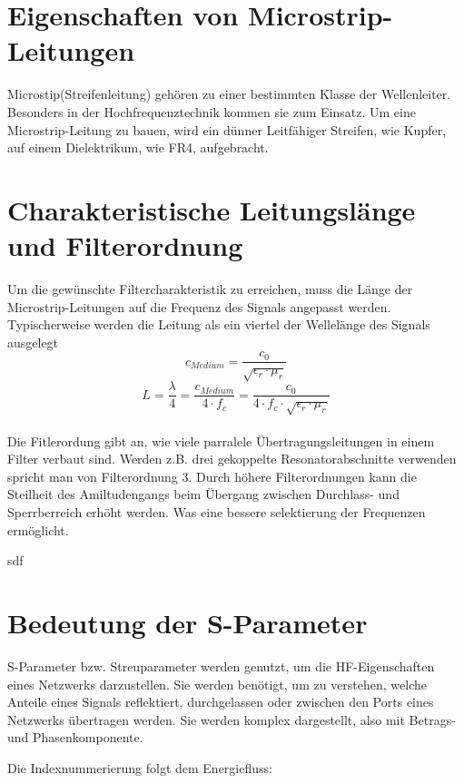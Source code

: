 \section{Eigenschaften von Microstrip-Leitungen}
Microstip(Streifenleitung) gehören zu einer bestimmten Klasse der Wellenleiter.
Besonders in der Hochfrequenztechnik kommen sie zum Einsatz.
Um eine Microstrip-Leitung zu bauen, wird ein dünner Leitfähiger Streifen, wie Kupfer, auf einem Dielektrikum, wie FR4, aufgebracht.
\newpage
\section{Charakteristische Leitungslänge und Filterordnung}
Um die gewünschte Filtercharakteristik zu erreichen,
muss die Länge der Microstrip-Leitungen auf die Frequenz des Signals angepasst werden.
Typischerweise werden die Leitung als ein viertel der Wellelänge des Signals ausgelegt
\begin{equation}
    c_{Medium} = \frac{c_0}{\sqrt{\epsilon_r \cdot \mu_r}}
\end{equation}
\begin{equation}
    L= \frac{\lambda}{4} = \frac{c_{Medium}}{4 \cdot f_c}=\frac{c_0}{4 \cdot f_c \cdot \sqrt{\epsilon_r \cdot \mu_r}}
    \label{eq:laenge}
\end{equation}
\\
Die Fitlerordung gibt an, wie viele parralele Übertragungsleitungen in einem Filter verbaut sind.
Werden z.B. drei gekoppelte Resonatorabschnitte verwenden spricht man von Filterordnung 3.
Durch höhere Filterordnungen kann die Steilheit des Amiltudengangs beim Übergang zwischen Durchlass- und Sperrberreich erhöht werden.
Was eine bessere selektierung der Frequenzen ermöglicht.


sdf



\section{Bedeutung der S-Parameter}
S-Parameter bzw. Streuparameter werden genutzt, um die HF-Eigenschaften eines
Netzwerks darzustellen. Sie werden benötigt, um zu verstehen, welche Anteile eines Signals
reflektiert, durchgelassen oder zwischen den Ports eines Netzwerks übertragen werden.
Sie werden komplex dargestellt, also mit Betrags- und Phasenkomponente.

Die Indexnummerierung folgt dem Energiefluss:

